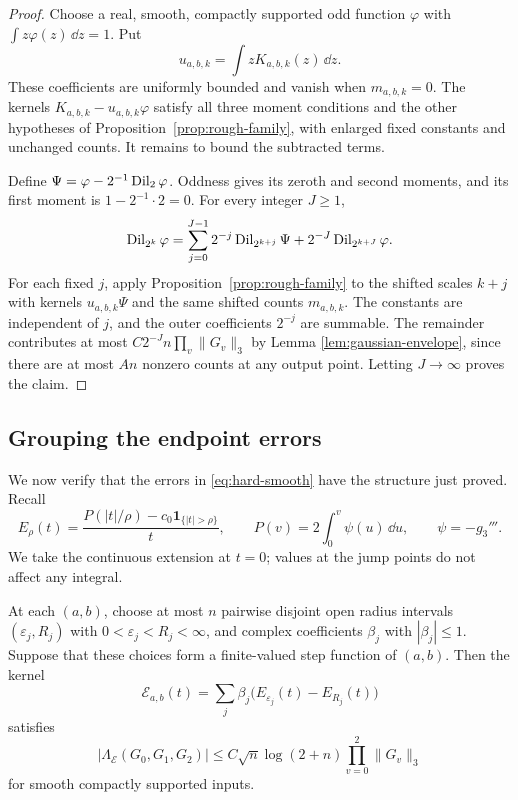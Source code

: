 \begin{proof}
Choose a real, smooth, compactly supported odd function $\varphi$ with
$\int z\varphi(z)\,\dd z=1$.  Put
\[
 u_{a,b,k}=\int zK_{a,b,k}(z)\,\dd z.
\]
These coefficients are uniformly bounded and vanish when
$m_{a,b,k}=0$.  The kernels $K_{a,b,k}-u_{a,b,k}\varphi$ satisfy all
three moment conditions and the other hypotheses of
Proposition~\ref{prop:rough-family}, with enlarged fixed constants
and unchanged counts.  It remains to bound the subtracted terms.

Define $\Psi=\varphi-2^{-1}\operatorname{Dil}_2\varphi$.
Oddness gives its zeroth and second moments, and its first moment is
$1-2^{-1}\cdot2=0$.  For every integer $J\ge1$,
\[
 \operatorname{Dil}_{2^k}\varphi
 =\sum_{j=0}^{J-1}2^{-j}\operatorname{Dil}_{2^{k+j}}\Psi
   +2^{-J}\operatorname{Dil}_{2^{k+J}}\varphi.
\]
For each fixed $j$, apply Proposition~\ref{prop:rough-family} to the
shifted scales $k+j$ with kernels $u_{a,b,k}\Psi$ and the same shifted
counts $m_{a,b,k}$.  The constants are independent of $j$, and the
outer coefficients $2^{-j}$ are summable.  The remainder contributes
at most $C2^{-J}n\prod_v\|G_v\|_3$ by Lemma
\ref{lem:gaussian-envelope}, since there are at most $An$ nonzero
counts at any output point.  Letting $J\to\infty$ proves the claim.
\end{proof}

\subsection{Grouping the endpoint errors}

We now verify that the errors in \eqref{eq:hard-smooth} have the
structure just proved.  Recall
\[
 E_\rho(t)
 =\frac{P(|t|/\rho)-c_0\mathbf1_{\{|t|>\rho\}}}{t},
 \qquad
 P(v)=2\int_0^v\psi(u)\,\dd u,
 \qquad \psi=-g_3'''.
\]
We take the continuous extension at $t=0$; values at the jump points
do not affect any integral.

\begin{proposition}
\label{prop:endpoint-errors}
At each $(a,b)$, choose at most $n$ pairwise disjoint open radius
intervals $(\varepsilon_j,R_j)$ with $0<\varepsilon_j<R_j<\infty$,
and complex coefficients
$\beta_j$ with $|\beta_j|\le1$.  Suppose that these choices form a
finite-valued step function of $(a,b)$.  Then the kernel
\[
 \mathcal E_{a,b}(t)
 =\sum_j\beta_j
       \bigl(E_{\varepsilon_j}(t)-E_{R_j}(t)\bigr)
\]
satisfies
\begin{equation}
 |\Lambda_{\mathcal E}(G_0,G_1,G_2)|
 \le C\sqrt n\log(2+n)\prod_{v=0}^2\|G_v\|_3
 \label{eq:endpoint-error-bound}
\end{equation}
for smooth compactly supported inputs.
\end{proposition}

